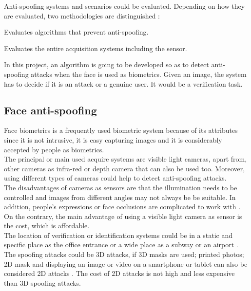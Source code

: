 Anti-spoofing systems and scenarios could be evaluated. Depending on how they are evaluated, two methodologies are distinguished \cite{Spoofing_survey}:
\begin{description}[itemsep=2pt,topsep=8pt,parsep=0pt,partopsep=20pt]
\item[Algorithm-based or technology evaluation:] Evaluates algorithms that prevent anti-spoofing.
\item[System-based or scenario evaluation:] Evaluates the entire acquisition systems including the sensor.
\end{description}

In this project,  an algorithm is going to be developed so as to detect anti-spoofing attacks when the face is used as biometrics. Given an image, the system has to decide if it is an attack or a genuine user. It would be a verification task.

\subsection{Face anti-spoofing}
Face biometrics is a frequently used biometric system because of its attributes since it is not intrusive, it is easy capturing images and it is considerably accepted by people as biometrics. \\
 
The principal or main used acquire systems are visible light cameras, apart from, other cameras as infra-red or depth camera that can also be used too. Moreover, using different types of cameras could help to detect anti-spoofing attacks.\\
 
The disadvantages of cameras as sensors are that the illumination needs to be controlled and images from different angles may not always be be suitable. In addition, people’s expressions or face occlusions are complicated to work with \cite{survey2,2d_3d_face}. On the contrary, the main advantage of using a visible light camera as sensor is the cost, which is affordable. \\
 
The location of verification or identification systems could be in a static and specific place as the office entrance or a wide place as a subway or an airport \cite{survey2}.\\
 
The spoofing attacks could be 3D attacks, if 3D masks are used; printed photos; 2D mask and displaying an image or video on a smartphone or tablet can also be considered 2D attacks \cite{2d_3d_face}. The cost of 2D attacks is not high \cite{distorsion} and less expensive than 3D spoofing attacks.\\


